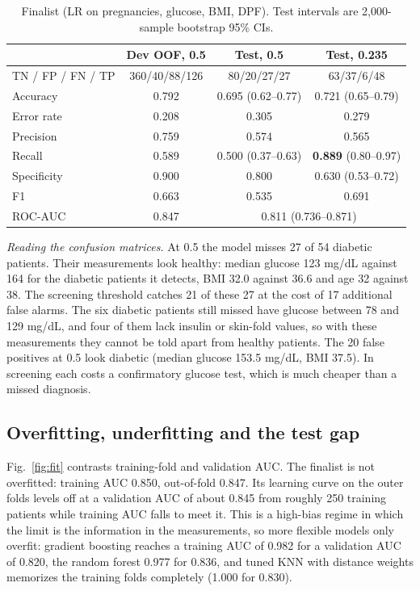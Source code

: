 \documentclass[conference]{IEEEtran}
\begin{document}
\begin{table}[!tb]
\centering
\caption{Finalist (LR on pregnancies, glucose, BMI, DPF). Test intervals are 2,000-sample bootstrap 95\% CIs.}
\label{tab:final}
\footnotesize
\setlength{\tabcolsep}{3pt}
\begin{tabular}{@{}lccc@{}}
\toprule
 & Dev OOF, 0.5 & Test, 0.5 & Test, 0.235 \\
\midrule
TN / FP / FN / TP & 360/40/88/126 & 80/20/27/27 & 63/37/6/48 \\
Accuracy & 0.792 & 0.695 {\scriptsize(0.62--0.77)} & 0.721 {\scriptsize(0.65--0.79)} \\
Error rate & 0.208 & 0.305 & 0.279 \\
Precision & 0.759 & 0.574 & 0.565 \\
Recall & 0.589 & 0.500 {\scriptsize(0.37--0.63)} & \textbf{0.889} {\scriptsize(0.80--0.97)} \\
Specificity & 0.900 & 0.800 & 0.630 {\scriptsize(0.53--0.72)} \\
F1 & 0.663 & 0.535 & 0.691 \\
ROC-AUC & 0.847 & \multicolumn{2}{c}{0.811 {\scriptsize(0.736--0.871)}} \\
\bottomrule
\end{tabular}
\end{table}

\textit{Reading the confusion matrices.} At 0.5 the model misses 27 of 54 diabetic patients. Their measurements look healthy: median glucose 123 mg/dL against 164 for the diabetic patients it detects, BMI 32.0 against 36.6 and age 32 against 38. The screening threshold catches 21 of these 27 at the cost of 17 additional false alarms. The six diabetic patients still missed have glucose between 78 and 129 mg/dL, and four of them lack insulin or skin-fold values, so with these measurements they cannot be told apart from healthy patients. The 20 false positives at 0.5 look diabetic (median glucose 153.5 mg/dL, BMI 37.5). In screening each costs a confirmatory glucose test, which is much cheaper than a missed diagnosis.

\subsection{Overfitting, underfitting and the test gap}
Fig.~\ref{fig:fit} contrasts training-fold and validation AUC. The finalist is not overfitted: training AUC 0.850, out-of-fold 0.847. Its learning curve on the outer folds levels off at a validation AUC of about 0.845 from roughly 250 training patients while training AUC falls to meet it. This is a high-bias regime in which the limit is the information in the measurements, so more flexible models only overfit: gradient boosting reaches a training AUC of 0.982 for a validation AUC of 0.820, the random forest 0.977 for 0.836, and tuned KNN with distance weights memorizes the training folds completely (1.000 for 0.830).
\end{document}
